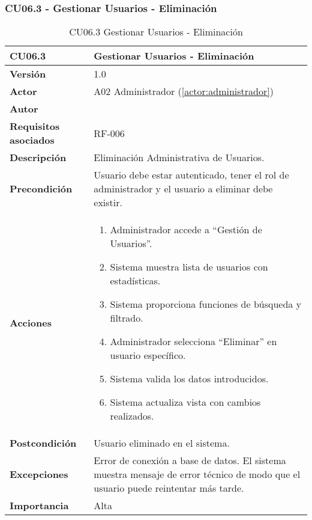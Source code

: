 \subsubsection{CU06.3 - Gestionar Usuarios - Eliminación}

\begin{table}[H]
	\centering
	\begin{tabularx}{\linewidth}{ p{} p{} }
		\toprule
		\textbf{CU06.3}    & \textbf{Gestionar Usuarios - Eliminación} \\
		\toprule
		\textbf{Versión}              & 1.0    \\
		\textbf{Actor}                & A02 Administrador (\ref{actor:administrador}) \\
		\textbf{Autor}                & \nombre \\
		\textbf{Requisitos asociados} & RF-006 \\
		\textbf{Descripción}          & Eliminación Administrativa de Usuarios. \\
		\textbf{Precondición}         & Usuario debe estar autenticado, tener el rol de administrador y el usuario a eliminar debe existir. \\
		\textbf{Acciones}             &
		\begin{enumerate}
			\def\labelenumi{\arabic{enumi}.}
			\tightlist
			\item Administrador accede a ``Gestión de Usuarios''.
            \item Sistema muestra lista de usuarios con estadísticas.
            \item Sistema proporciona funciones de búsqueda y filtrado.
            \item Administrador selecciona ``Eliminar'' en usuario específico.
            \item Sistema valida los datos introducidos.
            \item Sistema actualiza vista con cambios realizados.
		\end{enumerate}\\
		\textbf{Postcondición}        & Usuario eliminado en el sistema.\\
		\textbf{Excepciones}          & Error de conexión a base de datos. El sistema muestra mensaje de error técnico de modo que el usuario puede reintentar más tarde.\\
		\textbf{Importancia}          & Alta \\
		\bottomrule
	\end{tabularx}
	\caption{CU06.3 Gestionar Usuarios - Eliminación}
	\label{cu:gestionar-usuarios-eliminacion}
\end{table}


